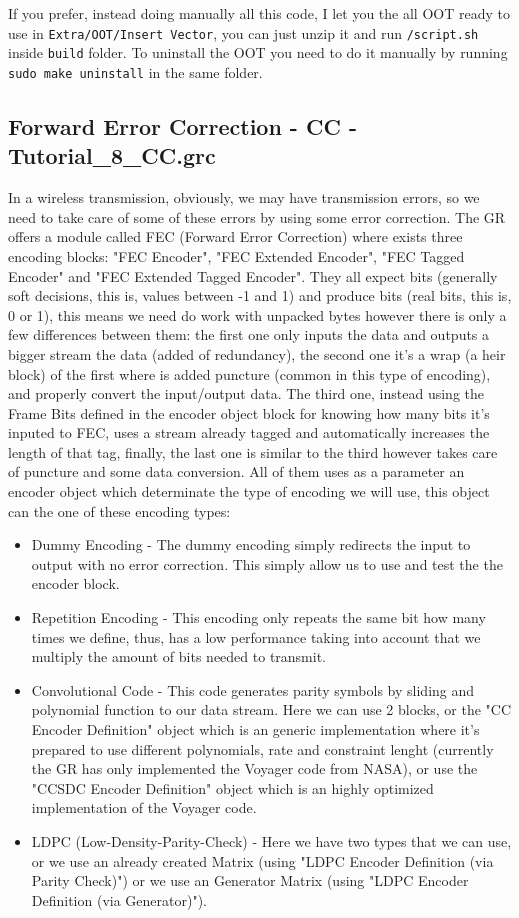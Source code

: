 \documentclass[a4paper, 10pt, conference]{ieeeconf}      %
\begin{document}
    If you prefer, instead doing manually all this code, I let you the all OOT ready to use in \verb|Extra/OOT/Insert Vector|, you can just unzip it and run \verb|/script.sh| inside \verb|build| folder. To uninstall the OOT you need to do it manually by running \verb|sudo make uninstall| in the same folder.
    
\subsection{Forward Error Correction - CC - Tutorial\_8\_CC.grc}
    In a wireless transmission, obviously, we may have transmission errors, so we need to take care of some of these errors by using some error correction. The GR offers a module called FEC (Forward Error Correction) where exists three encoding blocks: "FEC Encoder", "FEC Extended Encoder", "FEC Tagged Encoder" and "FEC Extended Tagged Encoder". They all expect bits (generally soft decisions, this is, values between -1 and 1) and produce bits (real bits, this is, 0 or 1), this means we need do work with unpacked bytes however there is only a few differences between them: the first one only inputs the data and outputs a bigger stream the data (added of redundancy), the second one it's a wrap (a heir block) of the first where is added puncture (common in this type of encoding), and properly convert the input/output data. The third one, instead using the Frame Bits defined in the encoder object block for knowing how many bits it's inputed to FEC, uses a stream already tagged and automatically increases the length of that tag, finally, the last one is similar to the third however takes care of puncture and some data conversion. All of them uses as a parameter an encoder object which determinate the type of encoding we will use, this object can the one of these encoding types:
    \begin{itemize}
        \item Dummy Encoding - The dummy encoding simply redirects the input to output with no error correction. This simply allow us to use and test the the encoder block.
        \item Repetition Encoding - This encoding only repeats the same bit how many times we define, thus, has a low performance taking into account that we multiply the amount of bits needed to transmit.
        \item Convolutional Code - This code generates parity symbols by sliding and polynomial function to our data stream. Here we can use 2 blocks, or the "CC Encoder Definition" object which is an generic implementation where it's prepared to use different polynomials, rate and constraint lenght (currently the GR has only implemented the Voyager code from NASA), or use the "CCSDC Encoder Definition" object which is an highly optimized implementation of the Voyager code.
        \item LDPC (Low-Density-Parity-Check) - Here we have two types that we can use, or we use an already created Matrix (using "LDPC Encoder Definition (via Parity Check)") or we use an Generator Matrix (using "LDPC Encoder Definition (via Generator)").
    \end{itemize}
\end{document}
